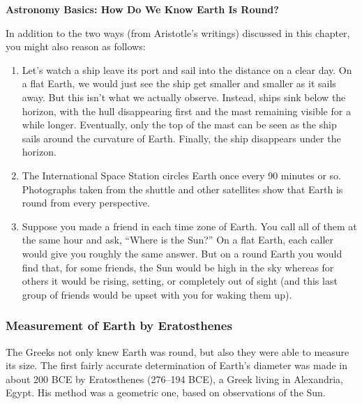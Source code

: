 \documentclass[main.tex]{subfiles}
\begin{document}
\begin{mdframed}[backgroundcolor=black!10]
    \textbf{Astronomy Basics: How Do We Know Earth Is Round?}
    
    \vspace{1ex}
    
    In addition to the two ways (from Aristotle's writings) discussed in this chapter, you might also reason as follows:
    
    \vspace{1ex}

    \begin{enumerate}
    \setlength\itemsep{0.1ex}
        \item Let's watch a ship leave its port and sail into the distance on a clear day. On a flat Earth, we would just see the ship get smaller and smaller as it sails away. But this isn't what we actually observe. Instead, ships sink below the horizon, with the hull disappearing first and the mast remaining visible for a while longer. Eventually, only the top of the mast can be seen as the ship sails around the curvature of Earth. Finally, the ship disappears under the horizon.
        \item  The International Space Station circles Earth once every 90 minutes or so. Photographs taken from the shuttle and other satellites show that Earth is round from every perspective.
        \item Suppose you made a friend in each time zone of Earth. You call all of them at the same hour and ask, ``Where is the Sun?'' On a flat Earth, each caller would give you roughly the same answer. But on a round Earth you would find that, for some friends, the Sun would be high in the sky whereas for others it would be rising, setting, or completely out of sight (and this last group of friends would be upset with you for waking them up).
    \end{enumerate}
\end{mdframed}

\subsubsection*{Measurement of Earth by Eratosthenes}

The Greeks not only knew Earth was round, but also they were able to measure its size. The first fairly accurate determination of Earth's diameter was made in about 200 BCE by Eratosthenes (276--194 BCE), a Greek living in Alexandria, Egypt. His method was a geometric one, based on observations of the Sun.
\end{document}

